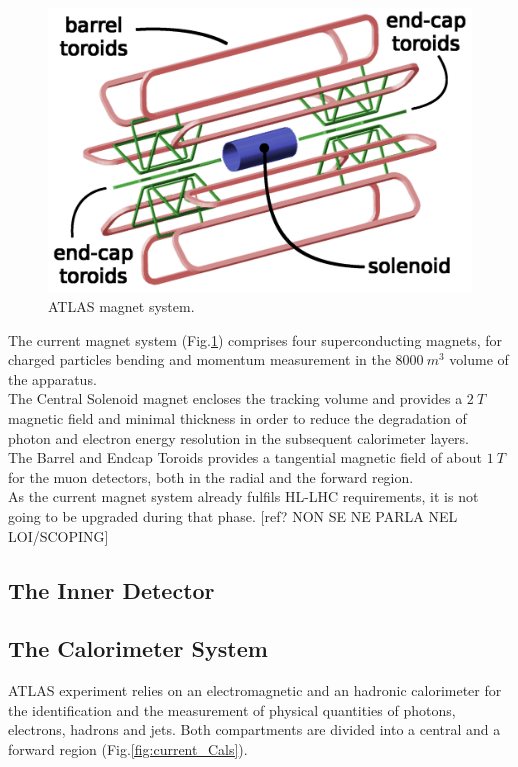 \documentclass[a4paper,12pt]{article}
\begin{document}
\begin{figure} [h]
	\includegraphics[width=\textwidth]{magnetSystems}
	\caption{ATLAS magnet system\cite{magnet_system_picture}.}
	\label{fig:magnet_system_picture}
\end{figure}

The current magnet system (Fig.\ref{fig:magnet_system_picture}) comprises four superconducting magnets\cite{magnetic_system}, for charged particles bending and momentum measurement in the $8000\ m^3$ volume of the apparatus.\\[2pt]
The Central Solenoid magnet encloses the tracking volume and provides a $2\ T$ magnetic field and minimal thickness in order to reduce the degradation of photon and electron energy resolution in the subsequent calorimeter layers.\\[2pt]
The Barrel and Endcap Toroids provides a tangential magnetic field of about $1\ T$ for the muon detectors, both in the radial and the forward region.\\[2pt]
As the current magnet system already fulfils HL-LHC requirements, it is not going to be
upgraded during that phase. [ref? NON SE NE PARLA NEL LOI/SCOPING]

\subsection{The Inner Detector}

\subsection{The Calorimeter System}

ATLAS experiment  relies on an electromagnetic and an hadronic calorimeter for the identification and the measurement of physical quantities of photons, electrons, hadrons and jets. 
Both compartments are divided into a central and a forward region (Fig.\ref{fig:current_Cals}).
\end{document}
